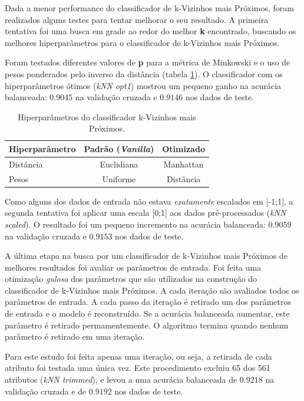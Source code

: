 \documentclass[final,5p]{elsarticle}
\numberwithin{equation}{section}
\begin{document}
        Dada a menor performance do classificador de k-Vizinhos mais Próximos, foram realizados alguns testes para tentar melhorar o seu resultado. A primeira tentativa foi uma busca em grade ao redor do melhor \textbf{k} encontrado, buscando os melhores hiperparâmetros para o classificador de k-Vizinhos mais Próximos.

        Foram testados diferentes valores de \textbf{p} para a métrica de Minkowski e o uso de pesos ponderados pelo inverso da distância (tabela \ref{tab:parâmetros_knn}). O classificador com os hiperparâmetros ótimos (\emph{kNN opt1}) mostrou um pequeno ganho na acurácia balanceada: $0.9045$ na validação cruzada e $0.9146$ nos dados de teste.

        \begin{table}[h]
            \centering
            \begin{tabular}{l c c}
                \toprule
                \textbf{Hiperparâmetro} & \textbf{Padrão (\emph{Vanilla})}  & \textbf{Otimizado} \\
                \midrule
                Distância    & Euclidiana & Manhattan \\
                Pesos    & Uniforme & Distância \\
                \bottomrule
            \end{tabular}
            \caption{Hiperparâmetros do classificador k-Vizinhos mais Próximos.}
            \label{tab:parâmetros_knn}
        \end{table}

        Como alguns dos dados de entrada não estava \emph{exatamente} escalados em [-1;1], a segunda tentativa foi aplicar uma escala [0;1] aos dados pré-processados (\emph{kNN scaled}). O resultado foi um pequeno incremento na acurácia balanceada: $0.9059$ na validação cruzada e $0.9153$ nos dados de teste.

        A última etapa na busca por um classificador de k-Vizinhos mais Próximos de melhores resultados foi avaliar os parâmetros de entrada. Foi feita uma otimização \emph{gulosa} dos parâmetros que são utilizados na construção do classificador de k-Vizinhos mais Próximos. A cada iteração são avaliados todos os parâmetros de entrada. A cada passo da iteração é retirado um dos parâmetros de entrada e o modelo é reconstruído. Se a acurácia balanceada aumentar, este parâmetro é retirado permamentemente. O algoritmo termina quando nenhum parâmetro é retirado em uma iteração.

        Para este estudo foi feita apenas uma iteração, ou seja, a retirada de cada atributo foi testada uma única vez. Este procedimento excluiu 65 dos 561 atributos (\emph{kNN trimmed}), e levou a uma acurácia balanceada de $0.9218$ na validação cruzada e de $0.9192$ nos dados de teste.
\end{document}
